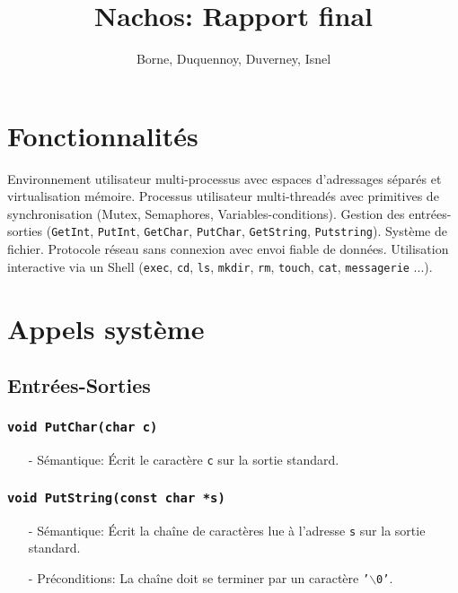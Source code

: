 \documentclass[11pt]{article}
\author{Borne, Duquennoy, Duverney, Isnel}
\date{}
\title{Nachos: Rapport final}
\theoremstyle{definition}
\theoremstyle{definition}
\begin{document}
\maketitle



\section{Fonctionnalités}
Environnement utilisateur multi-processus avec espaces d'adressages séparés et virtualisation mémoire.
Processus utilisateur multi-threadés avec primitives de synchronisation (Mutex, Semaphores, Variables-conditions). Gestion des entrées-sorties (\texttt{GetInt}, \texttt{PutInt}, \texttt{GetChar}, \texttt{PutChar}, \texttt{GetString}, \texttt{Putstring}).
Système de fichier. Protocole réseau sans connexion avec envoi fiable de données.
Utilisation interactive via un Shell (\texttt{exec}, \texttt{cd}, \texttt{ls}, \texttt{mkdir}, \texttt{rm},
\texttt{touch}, \texttt{cat}, \texttt{messagerie} ...).


\section{Appels système}
\subsection{Entrées-Sorties}

\subsubsection{\texttt{void PutChar(char c)}}
\begin{itemize}
\item[-] Sémantique: Écrit le caractère \texttt{c} sur la sortie standard.
\end{itemize}

\subsubsection{\texttt{void PutString(const char *s)}}
\begin{itemize}
\item[-] Sémantique: Écrit la chaîne de caractères lue à l'adresse \texttt{s} sur la sortie standard.
\item[-] Préconditions: La chaîne doit se terminer par un caractère \texttt{'$\backslash$0'}.
\end{itemize}
\end{document}
